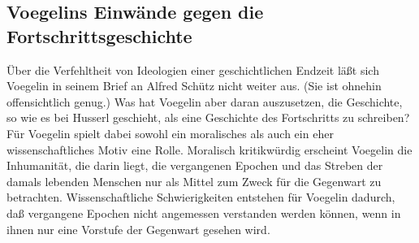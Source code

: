 \subsection{Voegelins Einwände gegen die Fortschrittsgeschichte}

Über die Verfehltheit von Ideologien einer geschichtlichen Endzeit läßt sich
Voegelin in seinem Brief an Alfred Schütz nicht weiter aus. (Sie ist ohnehin
offensichtlich genug.) Was hat Voegelin aber daran auszusetzen, die
Geschichte, so wie es bei Husserl geschieht, als eine Geschichte des
Fortschritts zu schreiben? Für Voegelin spielt dabei sowohl ein moralisches
als auch ein eher wissenschaftliches Motiv eine Rolle. Moralisch kritikwürdig
erscheint Voegelin die Inhumanität, die darin liegt, die vergangenen Epochen
und das Streben der damals lebenden Menschen nur als Mittel zum Zweck für die
Gegenwart zu betrachten. Wissenschaftliche Schwierigkeiten entstehen für
Voegelin dadurch, daß vergangene Epochen nicht angemessen verstanden werden
können, wenn in ihnen nur eine Vorstufe der Gegenwart gesehen wird.

